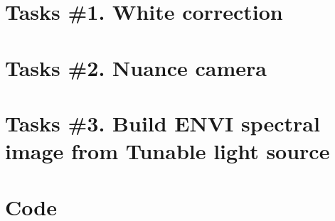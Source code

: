 \section{Tasks \#1. White correction}


\section{Tasks \#2. Nuance camera}


\section{Tasks \#3. Build ENVI spectral image from Tunable light
source}



\section{Code}








